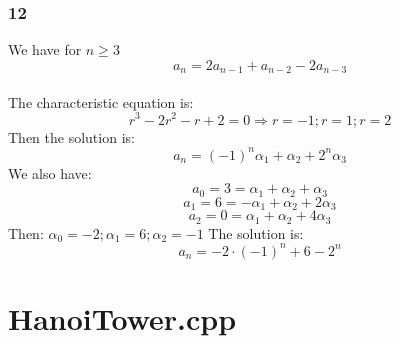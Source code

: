 \documentclass[12pt]{article}
\begin{document}
\begin{multicols}{2}
    \section*{12}
      We have for \(n\geq3\)
        \[a_n=2a_{n-1}+a_{n-2}-2a_{n-3}\]\\
      The characteristic equation is:
        \[r^3-2r^2-r+2=0\Rightarrow r=-1;r=1;r=2\]
      Then the solution is:
        \[a_n=(-1)^n\alpha_1+\alpha_2+2^n\alpha_3\]
      We also have:
        \[a_0=3=\alpha_1+\alpha_2+\alpha_3\]
        \[a_1=6=-\alpha_1+\alpha_2+2\alpha_3\]
        \[a_2=0=\alpha_1+\alpha_2+4\alpha_3\]
      Then: \(\alpha_0=-2; \alpha_1=6; \alpha_2=-1\)
      The solution is:
      \[a_n = -2\cdot(-1)^n + 6 - 2^n\]
  \end{multicols}

  \part*{HanoiTower.cpp}
    
\end{document}
